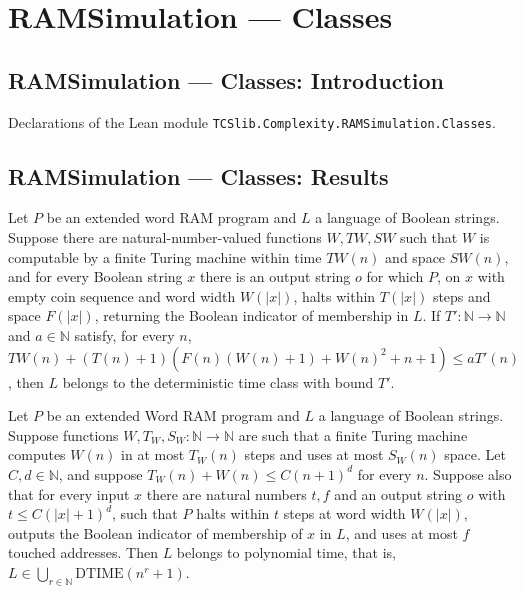 \section{RAMSimulation --- Classes}
\subsection*{RAMSimulation --- Classes: Introduction}

Declarations of the Lean module \texttt{TCSlib.Complexity.RAMSimulation.Classes}.

\subsection*{RAMSimulation --- Classes: Results}

\begin{theorem}
\label{WordRAM.mem_DTIME_of_decides}
\leanok
{}
Let $P$ be an extended word RAM program and $L$ a language of Boolean strings. Suppose
there are natural-number-valued functions $W,TW,SW$ such that $W$ is computable by a
finite Turing machine within time $TW(n)$ and space $SW(n)$, and for every Boolean
string $x$ there is an output string $o$ for which $P$, on $x$ with empty coin sequence
and word width $W(|x|)$, halts within $T(|x|)$ steps and space $F(|x|)$, returning the
Boolean indicator of membership in $L$. If $T':\mathbb{N}\to\mathbb{N}$ and
$a\in\mathbb{N}$ satisfy, for every $n$, $TW(n)+(T(n)+1)(F(n)(W(n)+1)+W(n)^2+n+1)\le
aT'(n)$, then $L$ belongs to the deterministic time class with bound $T'$.
\end{theorem}

\begin{theorem}
\label{WordRAM.mem_P_of_decides}
\leanok
{}
Let $P$ be an extended Word RAM program and $L$ a language of Boolean strings. Suppose
functions $W,T_W,S_W:\mathbb{N}\to\mathbb{N}$ are such that a finite Turing machine
computes $W(n)$ in at most $T_W(n)$ steps and uses at most $S_W(n)$ space. Let
$C,d\in\mathbb{N}$, and suppose $T_W(n)+W(n)\le C(n+1)^d$ for every $n$. Suppose also
that for every input $x$ there are natural numbers $t,f$ and an output string $o$ with
$t\le C(|x|+1)^d$, such that $P$ halts within $t$ steps at word width $W(|x|)$, outputs
the Boolean indicator of membership of $x$ in $L$, and uses at most $f$ touched
addresses. Then $L$ belongs to polynomial time, that is,
$L\in\bigcup_{r\in\mathbb{N}}\mathrm{DTIME}(n^r+1)$.
\end{theorem}

